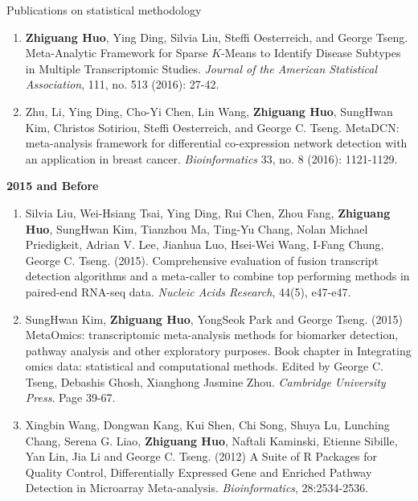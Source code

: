 \documentclass{resume} %
\begin{document}
\begin{rSection}{Publications on statistical methodology}
\begin{enumerate}[noitemsep,topsep=0pt,resume]
 \item  {\bf Zhiguang Huo}, Ying Ding, Silvia Liu, Steffi Oesterreich, and George Tseng. Meta-Analytic Framework for Sparse $K$-Means to Identify Disease Subtypes in Multiple Transcriptomic Studies. \emph{Journal of the American Statistical Association},  111, no. 513 (2016): 27-42.

\item 
Zhu, Li, Ying Ding, Cho-Yi Chen, Lin Wang,  {\bf Zhiguang Huo}, SungHwan Kim, Christos Sotiriou, Steffi Oesterreich, and George C. Tseng. MetaDCN: meta-analysis framework for differential co-expression network detection with an application in breast cancer. \emph{Bioinformatics} 33, no. 8 (2016): 1121-1129.
\end{enumerate}

\textbf{2015 and Before}
\begin{enumerate}[noitemsep,topsep=0pt,resume]
    \item Silvia Liu, Wei-Hsiang Tsai, Ying Ding, Rui Chen, Zhou Fang, {\bf Zhiguang Huo}, SungHwan Kim, Tianzhou Ma, Ting-Yu Chang, Nolan Michael Priedigkeit, Adrian V. Lee, Jianhua Luo, Hsei-Wei Wang, I-Fang Chung, George C. Tseng. (2015).
Comprehensive evaluation of fusion transcript detection algorithms and a meta-caller to combine top performing methods in paired-end RNA-seq data.
\emph{Nucleic Acids Research}, 44(5), e47-e47. 

\item SungHwan Kim,  {\bf Zhiguang Huo}, YongSeok Park and George Tseng.  (2015) MetaOmics: transcriptomic meta-analysis methods for biomarker detection, pathway analysis and other exploratory purposes. Book chapter in Integrating omics data: statistical and computational methods. Edited by George C. Tseng, Debashis Ghosh, Xianghong Jasmine Zhou. \emph{Cambridge University Press}. Page 39-67.

    \item Xingbin Wang, Dongwan Kang, Kui Shen, Chi Song, Shuya Lu, Lunching Chang, Serena G. Liao, {\bf Zhiguang Huo}, Naftali Kaminski, Etienne Sibille, Yan Lin, Jia Li and George C. Tseng. (2012) A Suite of R Packages for Quality Control, Differentially Expressed Gene and Enriched Pathway Detection in Microarray Meta-analysis. \emph{Bioinformatics}, 28:2534-2536.

\end{enumerate}


\end{rSection}
\end{document}
